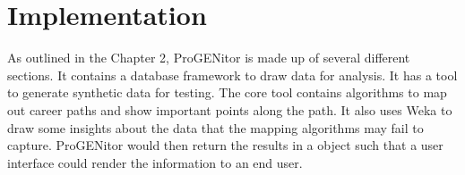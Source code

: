 \chapter{Implementation}
\label{chap:implementation}
As outlined in the Chapter 2, ProGENitor is made up of several
different sections.  It contains a database framework to draw data for
analysis.  It has a tool to generate synthetic data for testing.  The core tool
contains algorithms to map out career paths and show important points along the
path.  It also uses Weka to draw some insights about the data that the mapping
algorithms may fail to capture.  ProGENitor would then return the results in a
object such that a user interface could render the information to an end user.








